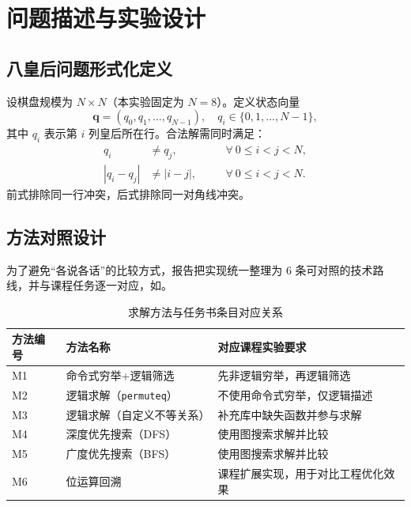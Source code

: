 ﻿\chapter{问题描述与实验设计}\label{chap:introduction}

\section{八皇后问题形式化定义}

设棋盘规模为 $N\times N$（本实验固定为 $N=8$）。定义状态向量
\begin{equation}
  \mathbf{q}=(q_0,q_1,\ldots,q_{N-1}),\quad q_i\in\{0,1,\ldots,N-1\},
\end{equation}
其中 $q_i$ 表示第 $i$ 列皇后所在行。合法解需同时满足：
\begin{align}
  q_i       & \neq q_j,\quad   &  & \forall\ 0\le i<j<N, \\
  |q_i-q_j| & \neq |i-j|,\quad &  & \forall\ 0\le i<j<N.
\end{align}
前式排除同一行冲突，后式排除同一对角线冲突。

\section{方法对照设计}

为了避免“各说各话”的比较方式，报告把实现统一整理为 6 条可对照的技术路线，并与课程任务逐一对应，如。

\begin{table}[htbp]
  \centering
  \caption{求解方法与任务书条目对应关系}\label{tab:method-overview}
  \begin{tabular}{p{2.0cm}p{4.4cm}p{6.4cm}}
    \toprule
    方法编号 & 方法名称                    & 对应课程实验要求          \\
    \midrule
    M1   & 命令式穷举+逻辑筛选              & 先非逻辑穷举，再逻辑筛选      \\
    M2   & 逻辑求解（\texttt{permuteq}） & 不使用命令式穷举，仅逻辑描述    \\
    M3   & 逻辑求解（自定义不等关系）           & 补充库中缺失函数并参与求解     \\
    M4   & 深度优先搜索（DFS）             & 使用图搜索求解并比较        \\
    M5   & 广度优先搜索（BFS）             & 使用图搜索求解并比较        \\
    M6   & 位运算回溯                   & 课程扩展实现，用于对比工程优化效果 \\
    \bottomrule
  \end{tabular}
\end{table}

